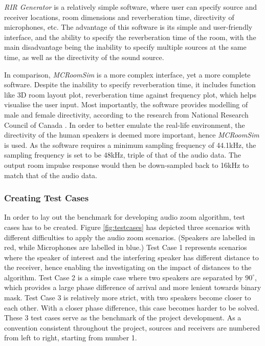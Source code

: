 \documentclass[a4paper,twoside,12pt,hidelinks]{article}
\begin{document}
\textit{RIR Generator} is a relatively simple software, where user can specify source and receiver locations, room dimensions and reverberation time, directivity of microphones, etc. The advantage of this software is its simple and user-friendly interface, and the ability to specify the reverberation time of the room, with the main disadvantage being the inability to specify multiple sources at the same time, as well as the directivity of the sound source.

In comparison, \textit{MCRoomSim} is a more complex interface, yet a more complete software. Despite the inability to specify reverberation time, it includes function like 3D room layout plot, reverberation time against frequency plot, which helps visualise the user input. Most importantly, the software provides modelling of male and female directivity, according to the research from National Research Council of Canada \cite{Chu2002DetailedTalkers}. In order to better emulate the real-life environment, the directivity of the human speakers is deemed more important, hence \textit{MCRoomSim} is used. As the software requires a minimum sampling frequency of 44.1kHz, the sampling frequency is set to be 48kHz, triple of that of the audio data. The output room impulse response would then be down-sampled back to 16kHz to match that of the audio data. 

\subsubsection{Creating Test Cases}
\label{testcase}
In order to lay out the benchmark for developing audio zoom algorithm, test cases has to be created. Figure \ref{fig:testcases} has depicted three scenarios with different difficulties to apply the audio zoom scenarios. (Speakers are labelled in red, while Microphones are labelled in blue.) Test Case 1 represents scenarios where the speaker of interest and the interfering speaker has different distance to the receiver, hence enabling the investigating on the impact of distances to the algorithm. Test Case 2 is a simple case where two speakers are separated by $90^{\circ}$, which provides a large phase difference of arrival and more lenient towards binary mask. Test Case 3 is relatively more strict, with two speakers become closer to each other. With a closer phase difference, this case becomes harder to be solved. These 3 test cases serve as the benchmark of the project development. As a convention consistent throughout the project, sources and receivers are numbered from left to right, starting from number 1.
\end{document}
